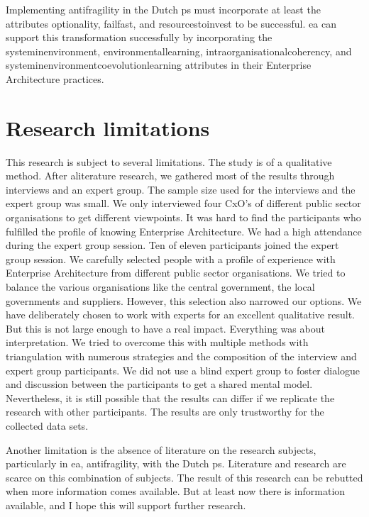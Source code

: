 Implementing \gls{antifragility} in the Dutch \gls{ps} must incorporate at least the \glspl{attribute} \gls{optionality}, \gls{failfast}, and \gls{resourcestoinvest} to be successful. \acrlong{ea} can support this transformation successfully by incorporating the \gls{systeminenvironment}, \gls{environmentallearning}, \gls{intraorganisationalcoherency}, and \gls{systeminenvironmentcoevolutionlearning} attributes in their Enterprise Architecture practices.

\section{Research limitations}
\label{sec:limitations}
This research is subject to several limitations. The study is of a qualitative method. After aliterature research, we gathered most of the results through interviews and an expert group. The sample size used for the interviews and the expert group was small. We only interviewed four CxO's of different public sector organisations to get different viewpoints. It was hard to find the participants who fulfilled the profile of knowing Enterprise Architecture. We had a high attendance during the expert group session. Ten of eleven participants joined the expert group session. We carefully selected people with a profile of experience with Enterprise Architecture from different public sector organisations. We tried to balance the various organisations like the central government, the local governments and suppliers. However, this selection also narrowed our options. We have deliberately chosen to work with experts for an excellent qualitative result. But this is not large enough to have a real impact. Everything was about interpretation. We tried to overcome this with multiple methods with triangulation with numerous strategies and the composition of the interview and expert group participants. We did not use a blind expert group to foster dialogue and discussion between the participants to get a shared mental model. Nevertheless, it is still possible that the results can differ if we replicate the research with other participants. The results are only trustworthy for the collected data sets. 

Another limitation is the absence of literature on the research subjects, particularly in \acrlong{ea}, \gls{antifragility}, with the Dutch \gls{ps}. Literature and research are scarce on this combination of subjects. The result of this research can be rebutted when more information comes available. But at least now there is information available, and I hope this will support further research.

